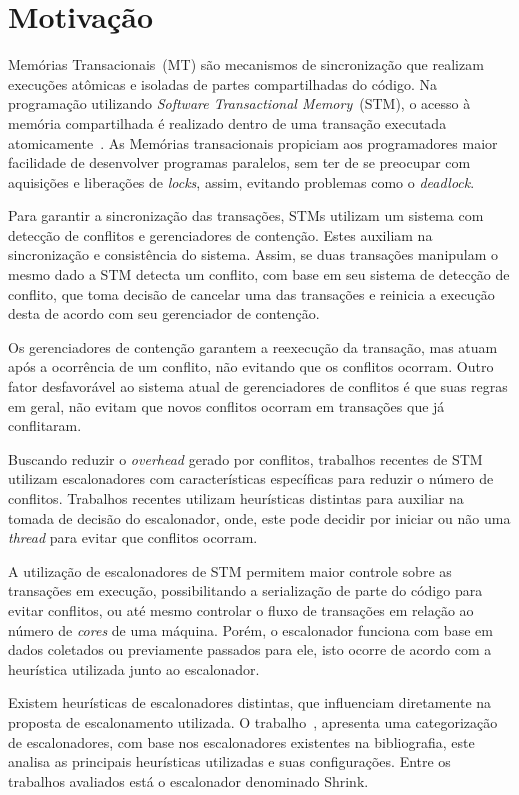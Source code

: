 \documentclass[diss-proposta,nocipinfo]{texufpel}
\begin{document}
\chapter{Motivação}

Memórias Transacionais~(MT) são mecanismos de sincronização que realizam execuções atômicas e isoladas de partes compartilhadas do código. Na programação utilizando \emph{Software Transactional Memory}~(STM), o acesso à memória compartilhada é realizado dentro de uma transação executada atomicamente~\cite{teixeira15}. As Memórias transacionais propiciam aos programadores maior facilidade de desenvolver programas paralelos, sem ter de se preocupar com aquisições e liberações de \emph{locks}, assim, evitando problemas como o \emph{deadlock}.

Para garantir a sincronização das transações, STMs utilizam um sistema com detecção de conflitos e gerenciadores de contenção. Estes auxiliam na sincronização e consistência do sistema. Assim, se duas transações manipulam o mesmo dado a STM detecta um conflito, com base em seu sistema de detecção de conflito, que toma decisão de cancelar uma das transações e reinicia a execução desta de acordo com seu gerenciador de contenção.

Os gerenciadores de contenção garantem a reexecução da transação, mas atuam após a ocorrência de um conflito, não evitando que os conflitos ocorram. Outro fator desfavorável ao sistema atual de gerenciadores de conflitos é que suas regras em geral, não evitam que novos conflitos ocorram em transações que já conflitaram.

Buscando reduzir o \emph{overhead} gerado por conflitos, trabalhos recentes de STM utilizam escalonadores com características específicas para reduzir o número de conflitos. Trabalhos recentes utilizam heurísticas distintas para auxiliar na tomada de decisão do escalonador, onde, este pode decidir por iniciar ou não uma \emph{thread} para evitar que conflitos ocorram.

A utilização de escalonadores de STM permitem maior controle sobre as transações em execução, possibilitando a serialização de parte do código para evitar conflitos, ou até mesmo controlar o fluxo de transações em relação ao número de \emph{cores} de uma máquina. Porém, o escalonador funciona com base em dados coletados ou previamente passados para ele, isto ocorre de acordo com a heurística utilizada junto ao escalonador.

Existem heurísticas de escalonadores distintas, que influenciam diretamente na proposta de escalonamento utilizada. O trabalho~\cite{sanzo17}, apresenta uma categorização de escalonadores, com base nos escalonadores existentes na bibliografia, este analisa as principais heurísticas utilizadas e suas configurações. Entre os trabalhos avaliados está o escalonador denominado Shrink.
\end{document}
